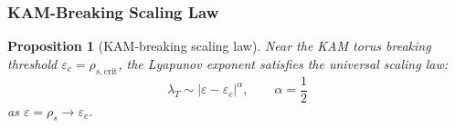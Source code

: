 \documentclass[
]{article}
\newtheorem{proposition}[theorem]{Proposition}
\begin{document}
\subsubsection{KAM-Breaking Scaling Law}\label{subsec:kam-scaling}

\begin{proposition}[KAM-breaking scaling law]\label{prop:kam-scaling}
Near the KAM torus breaking threshold $\varepsilon_c = \rho_{s,\text{crit}}$, the Lyapunov exponent satisfies the universal scaling law:
\begin{equation}\label{eq:kam-scaling}
\lambda_T \sim |\varepsilon - \varepsilon_c|^\alpha, \qquad \alpha = \frac{1}{2}
\end{equation}
as $\varepsilon = \rho_s \to \varepsilon_c$.
\end{proposition}
\end{document}
